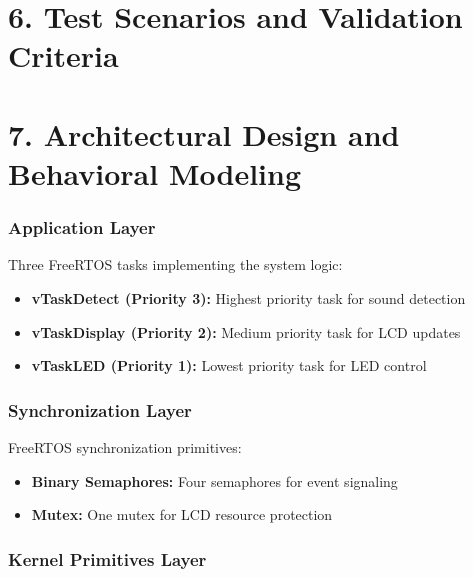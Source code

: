 \documentclass[12pt]{article}
\begin{document}
\section*{6. Test Scenarios and Validation Criteria}



\section*{7. Architectural Design and Behavioral Modeling}

\subsubsection*{Application Layer}

Three FreeRTOS tasks implementing the system logic:
\begin{itemize}
    \item \textbf{vTaskDetect (Priority 3):} Highest priority task for sound detection
    \item \textbf{vTaskDisplay (Priority 2):} Medium priority task for LCD updates
    \item \textbf{vTaskLED (Priority 1):} Lowest priority task for LED control
\end{itemize}

\subsubsection*{Synchronization Layer}

FreeRTOS synchronization primitives:
\begin{itemize}
    \item \textbf{Binary Semaphores:} Four semaphores for event signaling
    \item \textbf{Mutex:} One mutex for LCD resource protection
\end{itemize}

\subsubsection*{Kernel Primitives Layer}
\end{document}
